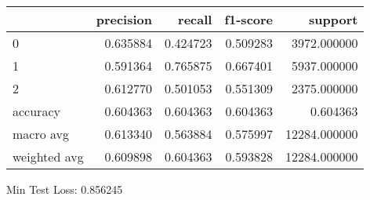 \begin{tabular}{lrrrr}
\toprule
{} &  precision &    recall &  f1-score &       support \\
\midrule
0            &   0.635884 &  0.424723 &  0.509283 &   3972.000000 \\
1            &   0.591364 &  0.765875 &  0.667401 &   5937.000000 \\
2            &   0.612770 &  0.501053 &  0.551309 &   2375.000000 \\
accuracy     &   0.604363 &  0.604363 &  0.604363 &      0.604363 \\
macro avg    &   0.613340 &  0.563884 &  0.575997 &  12284.000000 \\
weighted avg &   0.609898 &  0.604363 &  0.593828 &  12284.000000 \\
\bottomrule
\end{tabular}

Min Test Loss: 0.856245
